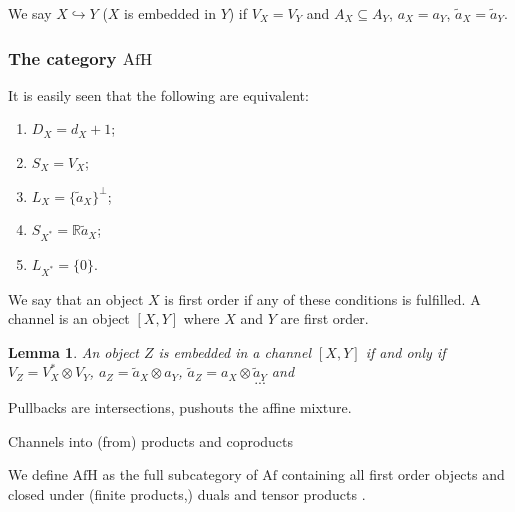 \documentclass[12pt]{article}
\newtheorem{lemma}{Lemma}
\theoremstyle{definition}
\theoremstyle{remark}
\def \Afh{\mathrm{AfH}}
\def \Af{\mathrm{Af}}
\begin{document}
We say $X\hookrightarrow Y$ ($X$ is embedded in $Y$) if  $V_X=V_Y$ and $A_X\subseteq A_Y$,
$a_X=a_Y$, $\tilde a_X=\tilde a_Y$.


\subsubsection{The category $\Afh$} 


It is easily seen that the following are equivalent:
\begin{enumerate}
\item $D_X=d_X+1$;
\item $S_X=V_X$;
\item $L_X=\{\tilde a_X\}^\perp$;
\item $S_{X^*}=\mathbb R \tilde a_X$;
\item $L_{X^*}=\{0\}$.
\end{enumerate}
We say that an object $X$ is first order if any of these conditions is fulfilled. A
channel is an object $[X,Y]$ where  $X$ and $Y$ are first order.

\begin{lemma}\label{lemma:channels} An object $Z$ is embedded in  a channel  $[X,Y]$ if
and only if $V_Z=V_{X}^*\otimes V_Y$, $a_Z=\tilde a_X\otimes a_Y$, $\tilde a_Z=a_X\otimes
\tilde a_Y$ and 
\[
...
\]

\end{lemma}

Pullbacks are intersections, pushouts the affine mixture.

Channels into (from) products and coproducts

We define $\Afh$ as the full subcategory of $\Af$ containing all first order objects and
closed under (finite products,) duals and  tensor products . 
\end{document}
